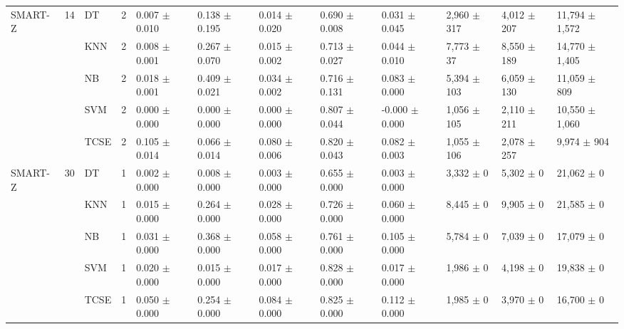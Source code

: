 \begin{table}[t]
\begin{tabular}{llllllllllll}
SMART-Z & 14 & DT & 2 & 0.007 $\pm$ 0.010 & 0.138 $\pm$ 0.195 & 0.014 $\pm$ 0.020 & 0.690 $\pm$ 0.008 & 0.031 $\pm$ 0.045 & 2,960 $\pm$ 317 & 4,012 $\pm$ 207 & 11,794 $\pm$ 1,572 \\
 &  & KNN & 2 & 0.008 $\pm$ 0.001 & 0.267 $\pm$ 0.070 & 0.015 $\pm$ 0.002 & 0.713 $\pm$ 0.027 & 0.044 $\pm$ 0.010 & 7,773 $\pm$ 37 & 8,550 $\pm$ 189 & 14,770 $\pm$ 1,405 \\
 &  & NB & 2 & 0.018 $\pm$ 0.001 & 0.409 $\pm$ 0.021 & 0.034 $\pm$ 0.002 & 0.716 $\pm$ 0.131 & 0.083 $\pm$ 0.000 & 5,394 $\pm$ 103 & 6,059 $\pm$ 130 & 11,059 $\pm$ 809 \\
 &  & SVM & 2 & 0.000 $\pm$ 0.000 & 0.000 $\pm$ 0.000 & 0.000 $\pm$ 0.000 & 0.807 $\pm$ 0.044 & -0.000 $\pm$ 0.000 & 1,056 $\pm$ 105 & 2,110 $\pm$ 211 & 10,550 $\pm$ 1,060 \\
 &  & TCSE & 2 & 0.105 $\pm$ 0.014 & 0.066 $\pm$ 0.014 & 0.080 $\pm$ 0.006 & 0.820 $\pm$ 0.043 & 0.082 $\pm$ 0.003 & 1,055 $\pm$ 106 & 2,078 $\pm$ 257 & 9,974 $\pm$ 904 \\
SMART-Z & 30 & DT & 1 & 0.002 $\pm$ 0.000 & 0.008 $\pm$ 0.000 & 0.003 $\pm$ 0.000 & 0.655 $\pm$ 0.000 & 0.003 $\pm$ 0.000 & 3,332 $\pm$ 0 & 5,302 $\pm$ 0 & 21,062 $\pm$ 0 \\
 &  & KNN & 1 & 0.015 $\pm$ 0.000 & 0.264 $\pm$ 0.000 & 0.028 $\pm$ 0.000 & 0.726 $\pm$ 0.000 & 0.060 $\pm$ 0.000 & 8,445 $\pm$ 0 & 9,905 $\pm$ 0 & 21,585 $\pm$ 0 \\
 &  & NB & 1 & 0.031 $\pm$ 0.000 & 0.368 $\pm$ 0.000 & 0.058 $\pm$ 0.000 & 0.761 $\pm$ 0.000 & 0.105 $\pm$ 0.000 & 5,784 $\pm$ 0 & 7,039 $\pm$ 0 & 17,079 $\pm$ 0 \\
 &  & SVM & 1 & 0.020 $\pm$ 0.000 & 0.015 $\pm$ 0.000 & 0.017 $\pm$ 0.000 & 0.828 $\pm$ 0.000 & 0.017 $\pm$ 0.000 & 1,986 $\pm$ 0 & 4,198 $\pm$ 0 & 19,838 $\pm$ 0 \\
 &  & TCSE & 1 & 0.050 $\pm$ 0.000 & 0.254 $\pm$ 0.000 & 0.084 $\pm$ 0.000 & 0.825 $\pm$ 0.000 & 0.112 $\pm$ 0.000 & 1,985 $\pm$ 0 & 3,970 $\pm$ 0 & 16,700 $\pm$ 0 \\
\bottomrule
\end{tabular}
\end{table}
